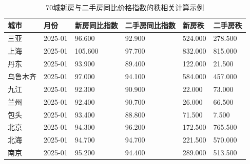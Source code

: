 \begin{table}[htbp]
\centering
\caption{70城新房与二手房同比价格指数的秩相关计算示例}
\label{tab:ch2-70city-rank}
\begin{tabular}{llllll}
\hline
城市 & 月份 & 新房同比指数 & 二手房同比指数 & 新房秩 & 二手房秩
\\
\hline
三亚 & 2025-01 & 96.600 & 92.900 & 524.000 & 278.500
\\
上海 & 2025-01 & 105.600 & 97.700 & 832.000 & 815.000
\\
丹东 & 2025-01 & 93.900 & 89.400 & 122.000 & 21.500
\\
乌鲁木齐 & 2025-01 & 97.000 & 94.100 & 584.000 & 457.000
\\
九江 & 2025-01 & 92.300 & 90.900 & 22.000 & 73.000
\\
兰州 & 2025-01 & 92.400 & 90.700 & 26.000 & 66.500
\\
包头 & 2025-01 & 93.400 & 88.800 & 71.500 & 7.500
\\
北京 & 2025-01 & 94.300 & 96.200 & 172.500 & 765.500
\\
北海 & 2025-01 & 94.700 & 94.700 & 221.500 & 570.000
\\
南京 & 2025-01 & 95.200 & 94.400 & 289.000 & 513.500
\\
\hline
\end{tabular}
\end{table}
